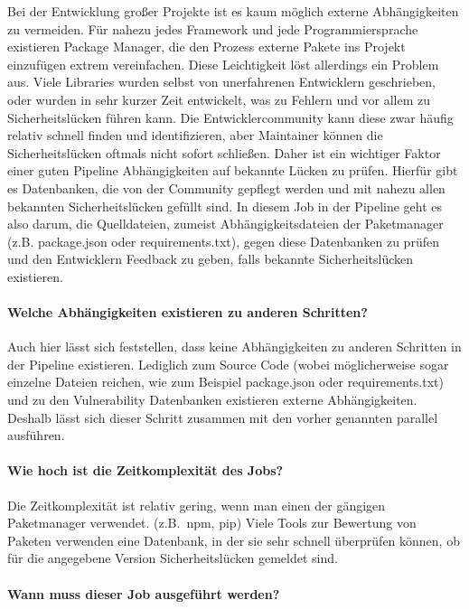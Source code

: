 Bei der Entwicklung großer Projekte ist es kaum möglich externe Abhängigkeiten zu vermeiden.
Für nahezu jedes Framework und jede Programmiersprache existieren Package Manager, die den Prozess externe Pakete ins Projekt einzufügen extrem vereinfachen.
Diese Leichtigkeit löst allerdings ein Problem aus.
Viele Libraries wurden selbst von unerfahrenen Entwicklern geschrieben, oder wurden in sehr kurzer Zeit entwickelt, was zu Fehlern und vor allem zu Sicherheitslücken führen kann.
Die Entwicklercommunity kann diese zwar häufig relativ schnell finden und identifizieren, aber Maintainer können die Sicherheitslücken oftmals nicht sofort schließen.
Daher ist ein wichtiger Faktor einer guten Pipeline Abhängigkeiten auf bekannte Lücken zu prüfen.
Hierfür gibt es Datenbanken, die von der Community gepflegt werden und mit nahezu allen bekannten Sicherheitslücken gefüllt sind.
In diesem Job in der Pipeline geht es also darum, die Quelldateien, zumeist Abhängigkeitsdateien der Paketmanager (z.B. package.json oder requirements.txt), gegen diese Datenbanken zu prüfen und den Entwicklern Feedback zu geben, falls bekannte Sicherheitslücken existieren.

\paragraph{Welche Abhängigkeiten existieren zu anderen Schritten?}

Auch hier lässt sich feststellen, dass keine Abhängigkeiten zu anderen Schritten in der Pipeline existieren.
Lediglich zum Source Code (wobei möglicherweise sogar einzelne Dateien reichen, wie zum Beispiel package.json oder requirements.txt) und zu den Vulnerability Datenbanken existieren externe Abhängigkeiten.
Deshalb lässt sich dieser Schritt zusammen mit den vorher genannten parallel ausführen.

\paragraph{Wie hoch ist die Zeitkomplexität des Jobs?}

Die Zeitkomplexität ist relativ gering, wenn man einen der gängigen Paketmanager verwendet. (z.B.\ npm, pip)
Viele Tools zur Bewertung von Paketen verwenden eine Datenbank, in der sie sehr schnell überprüfen können, ob für die angegebene Version Sicherheitslücken gemeldet sind.

\paragraph{Wann muss dieser Job ausgeführt werden?}

